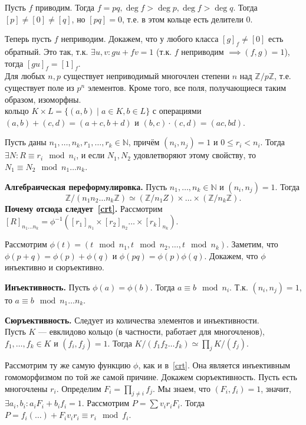 \documentclass[12pt,a4paper]{article}
\begin{document}
\proof Пусть $f$ приводим. Тогда $f=pq,\deg f>\deg p,\deg f>\deg q$. Тогда $[p]\neq [0]\neq [q]$, но $[pq]=0$, т.е. в этом кольце есть делители 0.

Теперь пусть $f$ неприводим. Докажем, что у любого класса $[g]_f\neq [0]$ есть обратный. Это так, т.к. $\exists u,v:gu+fv=1$ (т.к. $f$ неприводим $\implies (f,g)=1$), тогда $[gu]_f=[1]_f$. \QEDA\\

\theorem Для любых $n,p$ существует неприводимый многочлен степени $n$ над $\mathbb Z /p\mathbb Z$, т.е. существует поле из $p^n$ элементов. Кроме того, все поля, получающиеся таким образом, изоморфны.\\

 кольцо $K\times L=\{(a,b)\mid a\in K,b\in L\}$ с операциями $(a,b)+(c,d)=(a+c,b+d)$ и $(b,c)\cdot (c,d)=(ac,bd)$.

 Пусть даны $n_1,\ldots ,n_k,r_1,\ldots ,r_k\in \mathbb N$, причём $(n_i,n_j)=1$ и $0\leq r_i<n_i$. Тогда $\exists N:R\equiv r_i\mod n_i$, и если $N_1,N_2$ удовлетворяют этому свойству, то $N_1\equiv N_2\mod n_1\ldots n_k$.\label{crt}

\textbf{Алгебраическая переформулировка.} Пусть $n_1,\ldots ,n_k\in \mathbb N$ и $(n_i,n_j)=1$. Тогда \[
	\mathbb Z /(n_1n_2\ldots n_k\mathbb Z)\simeq (\mathbb Z /n_1Z)\times \ldots \times (\mathbb Z /n_k\mathbb Z).
\]
\textbf{Почему отсюда следует~\ref{crt}.} Рассмотрим $[R]_{n_1\ldots n_k}=\phi^{-1}([r_1]_{n_1}\times [r_2]_{n_2}\ldots \times [r_k]_{n_k})$.

\proof Рассмотрим $\phi(t)=(t\mod n_1,t\mod n_2,\ldots ,t\mod n_k)$. Заметим, что $\phi(p+q)=\phi(p)+\phi(q)$ и $\phi(pq)=\phi(p)\phi(q)$. Докажем, что $\phi$ инъективно и сюръективно.

\textbf{Инъективность.} Пусть $\phi(a)=\phi(b)$. Тогда $a\equiv b\mod n_i$. Т.к. $(n_i,n_j)=1$, то $a\equiv b\mod n_1\ldots n_k$.

\textbf{Сюръективность.} Следует из количества элементов и инъективности.\QEDA\\

 Пусть $K$ --- евклидово кольцо (в частности, работает для многочленов), $f_1,\ldots ,f_k\in K$ и $(f_i,f_j)=1$. Тогда $K /(f_1f_2\ldots f_k)\simeq \prod_j K / (f_j)$.

\proof Рассмотрим ту же самую функцию $\phi$, как и в~\ref{crt}. Она является инъективным гомоморфизмом по той же самой причине. Докажем сюръективность. Пусть есть многочлены $r_i$. Определим $F_i=\prod_{j\neq i} f_j$. Мы знаем, что $(F_i,f_i)=1$, значит, $\exists a_i,b_i:a_iF_i+b_if_i=1$. Рассмотрим $P=\sum v_ir_iF_i$. Тогда $P= f_i(\ldots )+F_iv_ir_i\equiv r_i\mod f_i$.\QEDA\\
\end{document}
